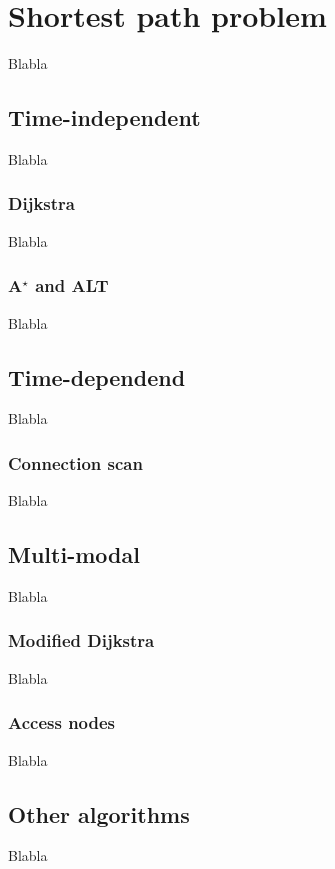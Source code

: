 \section{Shortest path problem}\label{shortestPathProblem}
	Blabla

\subsection{Time-independent}
	Blabla

\subsubsection{Dijkstra}
	Blabla

\subsubsection{A$^\star$ and ALT}\label{alt}
	Blabla

\subsection{Time-dependend}
	Blabla

\subsubsection{Connection scan}\label{csa}
	Blabla

\subsection{Multi-modal}
	Blabla

\subsubsection{Modified Dijkstra}\label{modifiedDijkstra}
	Blabla

\subsubsection{Access nodes}\label{accessNodes}
	Blabla

\subsection{Other algorithms}
	Blabla